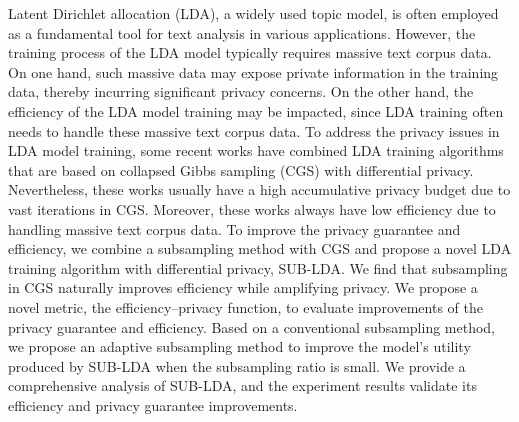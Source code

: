 Latent Dirichlet allocation (LDA), a widely used topic model, is often employed as a fundamental tool for text analysis in various applications. However, the training process of the LDA model typically requires massive text corpus data. On one hand, such massive data may expose private information in the training data, thereby incurring significant privacy concerns. On the other hand, the efficiency of the LDA model training may be impacted, since LDA training often needs to handle these massive text corpus data. To address the privacy issues in LDA model training, some recent works have combined LDA training algorithms that are based on collapsed Gibbs sampling (CGS) with differential privacy. Nevertheless, these works usually have a high accumulative privacy budget due to vast iterations in CGS. Moreover, these works always have low efficiency due to handling massive text corpus data. To improve the privacy guarantee and efficiency, we combine a subsampling method with CGS and propose a novel LDA training algorithm with differential privacy, SUB-LDA. We find that subsampling in CGS naturally improves efficiency while amplifying privacy. We propose a novel metric, the efficiency--privacy function, to evaluate improvements of the privacy guarantee and efficiency. Based on a conventional subsampling method, we propose an adaptive subsampling method to improve the model's utility produced by SUB-LDA when the subsampling ratio is small. We provide a comprehensive analysis of SUB-LDA, and the experiment results validate its efficiency and privacy guarantee improvements.

